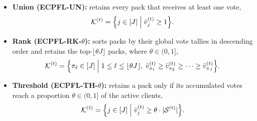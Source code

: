 \documentclass[a4paper,11pt]{article}
\begin{document}
\begin{itemize}
    \item \textbf{Union (\textsc{ECPFL-UN}):} retains every pack that receives at least one vote,
    \begin{equation}
        \mathcal{K}^{(t)} = \Bigl\{ j \in [J] \;\Big|\; \bar{v}_j^{(t)} \ge 1 \Bigr\}.
    \end{equation}

    \item \textbf{Rank (\textsc{ECPFL-RK-}$\theta$):} sorts packs by their global vote tallies in descending order and retains the top-$\lfloor \theta J \rfloor$ packs, where $\theta \in (0,1]$,
    \begin{equation}
        \mathcal{K}^{(t)} = \Bigl\{ \pi_\ell \in [J] \;\Big|\; 1 \le \ell \le \lfloor \theta J \rfloor,\; \bar{v}_{\pi_1}^{(t)} \ge \bar{v}_{\pi_2}^{(t)} \ge \dots \ge \bar{v}_{\pi_J}^{(t)} \Bigr\}.
    \end{equation}

    \item \textbf{Threshold (\textsc{ECPFL-TH-}$\theta$):} retains a pack only if its accumulated votes reach a proportion $\theta \in (0,1]$ of the active clients,
    \begin{equation}
        \mathcal{K}^{(t)} = \Bigl\{ j \in [J] \;\Big|\; \bar{v}_j^{(t)} \ge \theta \cdot |\mathcal{S}^{(t)}| \Bigr\}.
    \end{equation}
\end{itemize}
\end{document}
